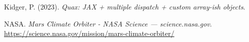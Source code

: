 \documentclass[
]{article}
\newlength{\cslhangindent}
\newenvironment{CSLReferences}[2] %
 {\begin{list}{}{%
  \setlength{\itemindent}{0pt}
  \setlength{\leftmargin}{0pt}
  \setlength{\parsep}{0pt}
  \ifodd #1
   \setlength{\leftmargin}{\cslhangindent}
   \setlength{\itemindent}{-1\cslhangindent}
  \fi
  \setlength{\itemsep}{#2\baselineskip}}}
 {\end{list}}
\begin{document}
\begin{CSLReferences}{1}{0}
Kidger, P. (2023). \emph{{Quax}: {JAX} + multiple dispatch + custom
array-ish objects}.

NASA. \emph{{M}ars {C}limate {O}rbiter - {N}{A}{S}{A} {S}cience ---
science.nasa.gov}.
\url{https://science.nasa.gov/mission/mars-climate-orbiter/}

\end{CSLReferences}
\end{document}
